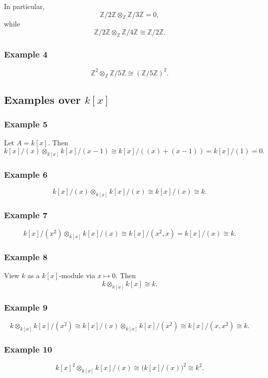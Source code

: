 \documentclass[12pt,a4paper]{article}
\theoremstyle{notespace}
\begin{document}
In particular,
\[
\mathbb Z/2\mathbb Z\otimes_{\mathbb Z}\mathbb Z/3\mathbb Z=0,
\]
while
\[
\mathbb Z/2\mathbb Z\otimes_{\mathbb Z}\mathbb Z/4\mathbb Z
\cong
\mathbb Z/2\mathbb Z.
\]

\subsubsection*{Example 4}
\[
\mathbb Z^2\otimes_{\mathbb Z}\mathbb Z/5\mathbb Z
\cong
(\mathbb Z/5\mathbb Z)^2.
\]

\subsection{Examples over \(k[x]\)}

\subsubsection*{Example 5}
Let \(A=k[x]\). Then
\[
k[x]/(x)\otimes_{k[x]} k[x]/(x-1)
\cong
k[x]/((x)+(x-1))
=
k[x]/(1)=0.
\]

\subsubsection*{Example 6}
\[
k[x]/(x)\otimes_{k[x]} k[x]/(x)
\cong
k[x]/(x)\cong k.
\]

\subsubsection*{Example 7}
\[
k[x]/(x^2)\otimes_{k[x]} k[x]/(x)
\cong
k[x]/(x^2,x)=k[x]/(x)\cong k.
\]

\subsubsection*{Example 8}
View \(k\) as a \(k[x]\)-module via \(x\mapsto 0\). Then
\[
k\otimes_{k[x]} k[x]\cong k.
\]

\subsubsection*{Example 9}
\[
k\otimes_{k[x]} k[x]/(x^2)
\cong
k[x]/(x)\otimes_{k[x]} k[x]/(x^2)
\cong
k[x]/(x,x^2)\cong k.
\]

\subsubsection*{Example 10}
\[
k[x]^2\otimes_{k[x]} k[x]/(x)
\cong
\big(k[x]/(x)\big)^2
\cong
k^2.
\]
\end{document}
